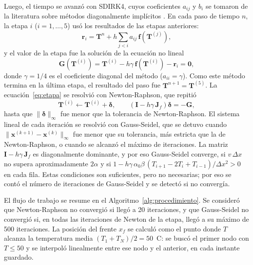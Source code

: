 \documentclass[final,5p,times,twocolumn,authoryear,11pt]{elsarticle}
\begin{document}
Luego, el tiempo se avanzó con SDIRK4, cuyos coeficientes $a_{ij}$ y $b_i$ se tomaron de la literatura sobre métodos diagonalmente implícitos \citep{Alexander1977, Kennedy2003}. En cada paso de tiempo $n$, la etapa $i$ ($i=1,\dots,5$) usó los resultados de las etapas anteriores:
\begin{equation}
\mathbf{r}_i=\mathbf{T}^n+h\sum_{j<i}a_{ij}\,\mathbf{f}(\mathbf{T}^{(j)}),
\label{eq:ri}
\end{equation}
\noindent y el valor de la etapa fue la solución de la ecuación no lineal
\begin{equation}
\mathbf{G}(\mathbf{T}^{(i)}) = \mathbf{T}^{(i)} - h\gamma\,\mathbf{f}(\mathbf{T}^{(i)}) - \mathbf{r}_i = \mathbf{0},
\label{eq:etapa}
\end{equation}
\noindent donde $\gamma = 1/4$ es el coeficiente diagonal del método ($a_{ii}=\gamma$). Como este método termina en la última etapa, el resultado del paso fue $\mathbf{T}^{n+1}=\mathbf{T}^{(5)}$. La ecuación~\eqref{eq:etapa} se resolvió con Newton-Raphson, que repitió
\begin{equation}
\mathbf{T}^{(i)} \leftarrow \mathbf{T}^{(i)} + \boldsymbol{\delta}, \qquad
\left(\mathbf{I} - h\gamma\,\mathbf{J}_f\right)\boldsymbol{\delta} = -\mathbf{G},
\label{eq:newton_lineal}
\end{equation}
\noindent hasta que $\|\boldsymbol{\delta}\|_\infty$ fue menor que la tolerancia de Newton-Raphson. El sistema lineal de cada iteración se resolvió con Gauss-Seidel, que se detuvo cuando $\|\mathbf{x}^{(k+1)}-\mathbf{x}^{(k)}\|_\infty$ fue menor que su tolerancia, más estricta que la de Newton-Raphson, o cuando se alcanzó el máximo de iteraciones. La matriz $\mathbf{I} - h\gamma\,\mathbf{J}_f$ es diagonalmente dominante, y por eso Gauss-Seidel converge, si $v\,\Delta x$ no supera aproximadamente $2\alpha$ y si $1-h\gamma\,\alpha_0\beta\,(T_{i+1}-2T_i+T_{i-1})/\Delta x^2>0$ en cada fila. Estas condiciones son suficientes, pero no necesarias; por eso se contó el número de iteraciones de Gauss-Seidel y se detectó si no convergía.

El flujo de trabajo se resume en el Algoritmo~\ref{alg:procedimiento}. Se consideró que Newton-Raphson no convergió si llegó a 20 iteraciones, y que Gauss-Seidel no convergió si, en todas las iteraciones de Newton de la etapa, llegó a su máximo de 500 iteraciones. La posición del frente $x_f$ se calculó como el punto donde $T$ alcanza la temperatura media $(T_1+T_N)/2=50$~\textdegree C: se buscó el primer nodo con $T\leq 50$ y se interpoló linealmente entre ese nodo y el anterior, en cada instante guardado.
\end{document}
